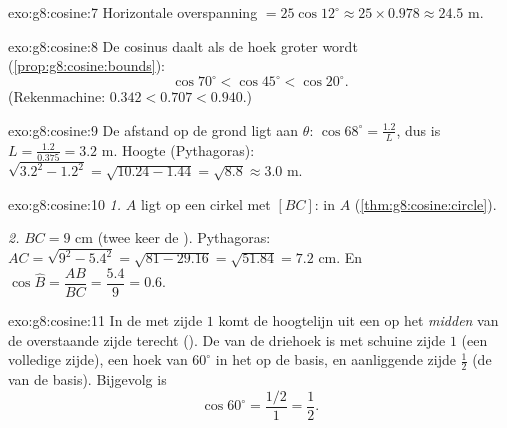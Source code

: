 \begin{solution}{exo:g8:cosine:7}
Horizontale overspanning $= 25 \cos 12^\circ \approx 25 \times 0.978 \approx
24.5$ m.
\end{solution}

\begin{solution}{exo:g8:cosine:8}
De cosinus daalt als de hoek groter wordt (\cref{prop:g8:cosine:bounds}):
\[
\cos 70^\circ < \cos 45^\circ < \cos 20^\circ .
\]
(Rekenmachine: $0.342 < 0.707 < 0.940$.)
\end{solution}

\begin{solution}{exo:g8:cosine:9}
De afstand op de grond ligt aan $\theta$: $\cos 68^\circ = \frac{1.2}{L}$, dus is
$L = \frac{1.2}{0.375} = 3.2$ m. Hoogte (Pythagoras):
$\sqrt{3.2^2 - 1.2^2} = \sqrt{10.24 - 1.44} = \sqrt{8.8} \approx 3.0$ m.
\end{solution}

\begin{solution}{exo:g8:cosine:10}
\emph{1.} $A$ ligt op een cirkel met  $[BC]$:  in $A$
(\cref{thm:g8:cosine:circle}).

\emph{2.} $BC = 9$ cm (twee keer de ). Pythagoras:
$AC = \sqrt{9^2 - 5.4^2} = \sqrt{81 - 29.16} = \sqrt{51.84} = 7.2$ cm. En
$\cos\widehat B = \dfrac{AB}{BC} = \dfrac{5.4}{9} = 0.6$.
\end{solution}

\begin{solution}{exo:g8:cosine:11}
In de  met zijde $1$ komt de hoogtelijn uit een  op
het \emph{midden} van de overstaande zijde terecht (). De  van de
driehoek is  met schuine zijde $1$ (een volledige zijde), een hoek van
$60^\circ$ in het  op de basis, en aanliggende zijde $\frac12$ (de 
van de basis). Bijgevolg is
\[
\cos 60^\circ = \frac{1/2}{1} = \frac12 .
\]
\end{solution}

